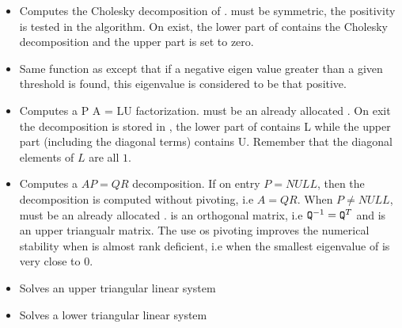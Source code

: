 \begin{itemize}
\item {}
  \sshortdescribe Computes the Cholesky decomposition of .  must
  be symmetric, the positivity is tested in the algorithm. On exist, the lower
  part of  contains the Cholesky decomposition and the upper part is
  set to zero.

\item {}
  \sshortdescribe Same function as  except that if a negative
  eigen value greater than a given threshold is found, this eigenvalue is
  considered to be that positive.

\item {} 
  \sshortdescribe Computes a P A = LU factorization.  must be an
  already allocated  . On exit the decomposition is
  stored in , the lower part of  contains L while the upper part
  (including the diagonal terms) contains U. Remember that the diagonal
  elements of $L$ are all $1$.
  
\item {} 
  \sshortdescribe Computes a $A P = QR$ decomposition. If on entry $P=NULL$,
  then the decomposition is computed without pivoting, i.e $A = QR$. When $P
  \ne NULL$,  must be an already allocated
  .  is an orthogonal matrix, i.e
  ${\tt Q}^{-1} = {\tt Q}^{T}$ and  is an upper triangualr matrix. The
  use os pivoting improves the numerical stability when  is almost rank
  deficient, i.e when the smallest eigenvalue of  is very close to $0$.

\item {}
  \sshortdescribe Solves an upper triangular linear system 

\item {}
  \sshortdescribe Solves a lower triangular linear system  
  

\end{itemize}
